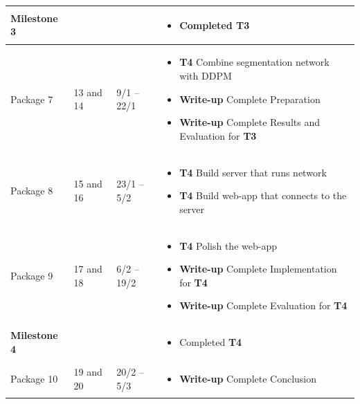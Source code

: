 \documentclass{article}
\begin{document}
\begin{longtable}{p{2.5cm}p{1.5cm}P{2.5cm}P{6.8cm}}
    \textbf{Milestone 3} &
    &
    &
    \begin{itemize}[label={--},noitemsep,leftmargin=*,topsep=0pt,partopsep=0pt]
        \item Completed \textbf{T3}
    \end{itemize}\\
    \hline
    
    Package 7 &
    13 and 14  &
    9/1 -- 22/1 &
    \begin{itemize}[label={--},noitemsep,leftmargin=*,topsep=0pt,partopsep=0pt]
        \item \textbf{T4} Combine segmentation network with DDPM
        \item \textbf{Write-up} Complete Preparation
        \item \textbf{Write-up} Complete Results and Evaluation for \textbf{T3} 
    \end{itemize}\\
    \hline
    
    Package 8 &
    15 and 16  &
    23/1 -- 5/2 &
    \begin{itemize}[label={--},noitemsep,leftmargin=*,topsep=0pt,partopsep=0pt]
        \item \textbf{T4} Build server that runs network
        \item \textbf{T4} Build web-app that connects to the server
    \end{itemize}\\
    \hline
    
    Package 9 &
    17 and 18  &
    6/2 -- 19/2 &
    \begin{itemize}[label={--},noitemsep,leftmargin=*,topsep=0pt,partopsep=0pt]
        \item \textbf{T4} Polish the web-app
        \item \textbf{Write-up} Complete Implementation for \textbf{T4}
        \item \textbf{Write-up} Complete Evaluation for \textbf{T4}
        \end{itemize}\\
    \hline
    
    \textbf{Milestone 4} &
    &
    &
    \begin{itemize}[label={--},noitemsep,leftmargin=*,topsep=0pt,partopsep=0pt]
        \item Completed \textbf{T4}
    \end{itemize}\\
    \hline
    
    Package 10 &
    19 and 20  &
    20/2 -- 5/3 &
    \begin{itemize}[label={--},noitemsep,leftmargin=*,topsep=0pt,partopsep=0pt]
        \item \textbf{Write-up} Complete Conclusion
    \end{itemize}\\

\bottomrule
\end{longtable}
\end{document}
